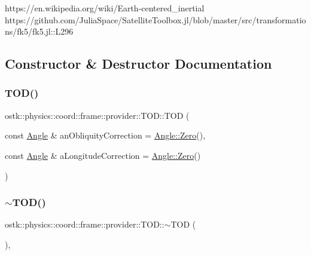 https\+://en.wikipedia.\+org/wiki/\+Earth-\/centered\+\_\+inertial https\+://github.com/\+Julia\+Space/\+Satellite\+Toolbox.\+jl/blob/master/src/transformations/fk5/fk5.jl\+::\+L296 

\subsection{Constructor \& Destructor Documentation}
\mbox{\label{classostk_1_1physics_1_1coord_1_1frame_1_1provider_1_1_t_o_d_ad04e95c1ab8ccfca5f6ed3c8d51639d4}} 
\subsubsection{\texorpdfstring{T\+O\+D()}{TOD()}}
{\footnotesize\ttfamily ostk\+::physics\+::coord\+::frame\+::provider\+::\+T\+O\+D\+::\+T\+OD (\begin{DoxyParamCaption}\item[{const \hyperlink{classostk_1_1physics_1_1units_1_1_angle}{Angle} \&}]{an\+Obliquity\+Correction = {\ttfamily \hyperlink{classostk_1_1physics_1_1units_1_1_angle_a4454975f87e5d3532cf8b819819207e7}{Angle\+::\+Zero}()},  }\item[{const \hyperlink{classostk_1_1physics_1_1units_1_1_angle}{Angle} \&}]{a\+Longitude\+Correction = {\ttfamily \hyperlink{classostk_1_1physics_1_1units_1_1_angle_a4454975f87e5d3532cf8b819819207e7}{Angle\+::\+Zero}()} }\end{DoxyParamCaption})}

\mbox{\label{classostk_1_1physics_1_1coord_1_1frame_1_1provider_1_1_t_o_d_a1e59c3f3d3d31e768deb99abb502b577}} 
\subsubsection{\texorpdfstring{$\sim$\+T\+O\+D()}{~TOD()}}
{\footnotesize\ttfamily ostk\+::physics\+::coord\+::frame\+::provider\+::\+T\+O\+D\+::$\sim$\+T\+OD (\begin{DoxyParamCaption}{ }\end{DoxyParamCaption})\hspace{0.3cm}{\ttfamily [override]}, {\ttfamily [virtual]}}



